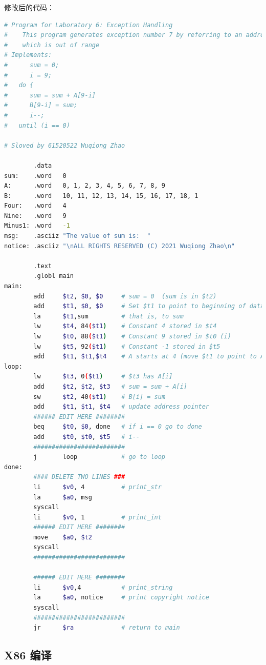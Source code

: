 \documentclass[11pt]{SEU-Digital-Report}
\begin{document}
      修改后的代码：
      \begin{lstlisting}[language=sh,tabsize=8,morekeywords={
        j,la,li,syscall,move,sll,sub,bge,sll,add,sw,addi,jal,ls,subu,jr,lw,bgt,bne,lbu,lb,sb,beq,slti,ori
      },title={exception7\_solved.asm}]
# Program for Laboratory 6: Exception Handling
#    This program generates exception number 7 by referring to an address
#    which is out of range
# Implements:
#      sum = 0;
#      i = 9;
#   do {
#      sum = sum + A[9-i]
#      B[9-i] = sum;
#      i--;
#   until (i == 0)

# Sloved by 61520522 Wuqiong Zhao

        .data
sum:    .word   0
A:      .word   0, 1, 2, 3, 4, 5, 6, 7, 8, 9
B:      .word   10, 11, 12, 13, 14, 15, 16, 17, 18, 1
Four:   .word   4
Nine:   .word   9
Minus1: .word   -1
msg:    .asciiz "The value of sum is:  "
notice: .asciiz "\nALL RIGHTS RESERVED (C) 2021 Wuqiong Zhao\n"

        .text
        .globl main
main:
        add     $t2, $0, $0     # sum = 0  (sum is in $t2)
        add     $t1, $0, $0     # Set $t1 to point to beginning of data,
        la      $t1,sum         # that is, to sum
        lw      $t4, 84($t1)    # Constant 4 stored in $t4
        lw      $t0, 88($t1)    # Constant 9 stored in $t0 (i)
        lw      $t5, 92($t1)    # Constant -1 stored in $t5
        add     $t1, $t1,$t4    # A starts at 4 (move $t1 to point to A)
loop:
        lw      $t3, 0($t1)     # $t3 has A[i]
        add     $t2, $t2, $t3   # sum = sum + A[i]
        sw      $t2, 40($t1)    # B[i] = sum
        add     $t1, $t1, $t4   # update address pointer
        ###### EDIT HERE ########
        beq     $t0, $0, done   # if i == 0 go to done
        add     $t0, $t0, $t5   # i--
        #########################
        j       loop            # go to loop
done:
        #### DELETE TWO LINES ###
        li      $v0, 4          # print_str
        la      $a0, msg
        syscall
        li      $v0, 1          # print_int
        ###### EDIT HERE ########
        move    $a0, $t2
        syscall
        #########################
        
        ###### EDIT HERE ########
        li      $v0,4           # print_string
        la      $a0, notice     # print copyright notice
        syscall
        #########################
        jr      $ra             # return to main

      \end{lstlisting}

    \subsection{X86 编译}\label{subsec:dosbox}
\end{document}
